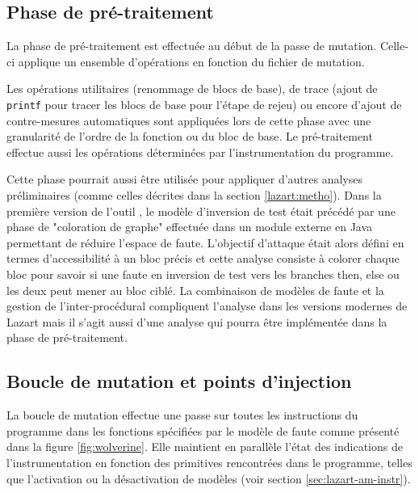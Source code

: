         \subsection{Phase de pré-traitement}
        \label{sec:lazart-impl-preprocess}
        
            La phase de pré-traitement est effectuée au début de la passe de mutation. Celle-ci applique un ensemble d'opérations en fonction du fichier de mutation.
            
            Les opérations utilitaires (renommage de blocs de base), de trace (ajout de \texttt{printf} pour tracer les blocs de base pour l'étape de rejeu) ou encore d'ajout de contre-mesures automatiques sont appliquées lors de cette phase avec une granularité de l'ordre de la fonction ou du bloc de base. 
            Le pré-traitement effectue aussi les opérations déterminées par l'instrumentation du programme.            
            
            Cette phase pourrait aussi être utilisée pour appliquer d'autres analyses préliminaires (comme celles décrites dans la section \ref{lazart:metho}).
            Dans la première version de l'outil \cite{Potet/ICST14}, le modèle d'inversion de test était précédé par une phase de "coloration de graphe" effectuée dans un module externe en Java permettant de réduire l'espace de faute. 
            L'objectif d'attaque était alors défini en termes d'accessibilité à un bloc précis et cette analyse consiste à colorer chaque bloc pour savoir si une faute en inversion de test vers les branches then, else ou les deux peut mener au bloc ciblé.
            La combinaison de modèles de faute et la gestion de l'inter-procédural compliquent l'analyse dans les versions modernes de Lazart mais il s'agit aussi d'une analyse qui pourra être implémentée dans la phase de pré-traitement.
            
        \subsection{Boucle de mutation et points d'injection}
        \label{sec:lazart-impl-ip-transf}
        
            La boucle de mutation effectue une passe sur toutes les instructions du programme dans les fonctions spécifiées par le modèle de faute comme présenté dans la figure \ref{fig:wolverine}.
            Elle maintient en parallèle l'état des indications de l'instrumentation en fonction des primitives rencontrées dans le programme, telles que l'activation ou la désactivation de modèles (voir section \ref{sec:lazart-am-instr}).
            
